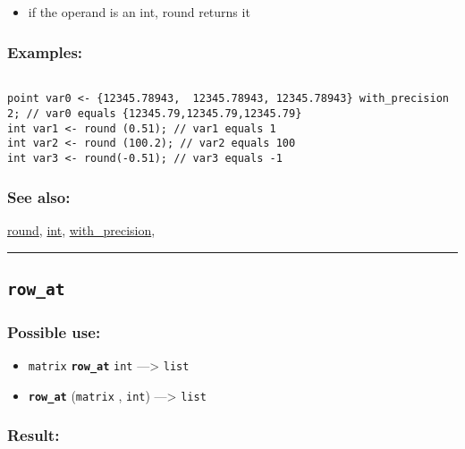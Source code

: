 \documentclass[]{book}
\providecommand{\tightlist}{%
  \setlength{\itemsep}{0pt}\setlength{\parskip}{0pt}}
\theoremstyle{definition}
\theoremstyle{definition}
\theoremstyle{definition}
\theoremstyle{remark}
\begin{document}
\begin{itemize}
\tightlist
\item
  if the operand is an int, round returns it
\end{itemize}

\subsubsection{Examples:}\label{examples-306}

\begin{verbatim}
 
point var0 <- {12345.78943,  12345.78943, 12345.78943} with_precision 2; // var0 equals {12345.79,12345.79,12345.79} 
int var1 <- round (0.51); // var1 equals 1 
int var2 <- round (100.2); // var2 equals 100 
int var3 <- round(-0.51); // var3 equals -1
\end{verbatim}

\subsubsection{See also:}\label{see-also-180}

\href{operators-n-to-r.html\#round}{round},
\href{operators-i-to-m.html\#int}{int},
\href{operators-s-to-z.html\#with_precision}{with\_precision},

\begin{center}\rule{0.5\linewidth}{\linethickness}\end{center}

\subsection{\texorpdfstring{\texttt{row\_at}}{row\_at}}\label{row_at}

\subsubsection{Possible use:}\label{possible-use-446}

\begin{itemize}
\tightlist
\item
  \texttt{matrix} \textbf{\texttt{row\_at}} \texttt{int}
  ---\textgreater{} \texttt{list}
\item
  \textbf{\texttt{row\_at}} (\texttt{matrix} , \texttt{int})
  ---\textgreater{} \texttt{list}
\end{itemize}

\subsubsection{Result:}\label{result-432}
\end{document}
